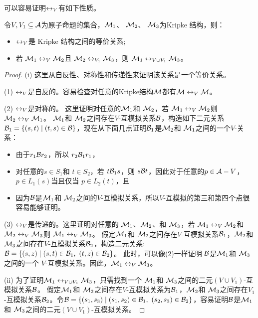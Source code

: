 可以容易证明$\leftrightarrow_V$有如下性质。

\begin{proposition} \label{pro:EqUnion}
	令$V, V_1 \subseteq {\cal A}$为原子命题的集合，${\cal M}_1$、 ${\cal M}_2$、 ${\cal M}_3$为Kripke 结构，则：
	\begin{itemize} 
		\item[(i)] $\leftrightarrow_V$是 Kripke 结构之间的等价关系;
		\item[(ii)] 若 ${\cal M}_1 \leftrightarrow_V {\cal M}_2$且 ${\cal M}_2 \leftrightarrow_{V_1} {\cal M}_3$，则 ${\cal M}_1 \leftrightarrow_{V \cup V_1} {\cal M}_3$。
	\end{itemize}
	
\end{proposition}
\begin{proof}
	(i) 这里从自反性、对称性和传递性来证明该关系是一个等价关系。
	
	(1) $\leftrightarrow_V$是自反的。容易检查对任意的Kripke结构${\cal M}$都有${\cal M}\leftrightarrow_V {\cal M}$。
	
	(2) $\leftrightarrow_V$是对称的。 这里证明对任意的${\cal M}_1$和 ${\cal M}_2$，若 ${\cal M}_1 \leftrightarrow_V {\cal M}_2$则 ${\cal M}_2 \leftrightarrow_V {\cal M}_1$。
	${\cal M}_1$和 ${\cal M}_2$之间存在$V$-互模拟关系${\cal B}$，构造如下二元关系${\cal B}_1=\{(s,t) \mid (t, s)\in {\cal B}\}$，现在从下面几点证明${\cal B}_1$是${\cal M}_2$和 ${\cal M}_1$之间的一个$V$-关系：
	\begin{itemize}
		\item 由于$r_1 {\cal B} r_2$，所以 $r_2 {\cal B}_1 r_1$，
		\item 对任意的$s\in S_1$和 $t\in S_2$，若 $t {\cal B}_1 s$，则 $s{\cal B} t$，因此对于任意的$p \in {\cal A} - V$，$p \in L_1(s)$当且仅当 $p \in L_2(t)$，且
		\item 因为${\cal B}$是${\cal M}_1$和 ${\cal M}_2$之间的$V$-互模拟关系，所以$V$-互模拟的第三和第四个点很容易能够证明。
	\end{itemize}
	
	(3) $\leftrightarrow_V$是传递的。这里证明对任意的 ${\cal M}_1$、${\cal M}_2$、和 ${\cal M}_3$，若 ${\cal M}_1 \leftrightarrow_V {\cal M}_2$和 ${\cal M}_2 \leftrightarrow_V {\cal M}_3$则 ${\cal M}_1 \leftrightarrow_V {\cal M}_3$。 假定${\cal M}_1$和 ${\cal M}_2$之间存在$V$-互模拟关系${\cal B}_1$，${\cal M}_2$和 ${\cal M}_3$之间存在$V$-互模拟关系${\cal B}_2$，构造二元关系: ${\cal B}=\{(s, z) \mid (s,t) \in {\cal B}_1,\ (t, z)\in {\cal B}_2\}$。
	此时，可以像(2)一样证明 ${\cal B}$是${\cal M}_1$和 ${\cal M}_3$之间的一个 $V$-互模拟关系。因此，${\cal M}_1 \leftrightarrow_V {\cal M}_3$。
	
	(ii) 为了证明${\cal M}_1 \leftrightarrow_{V\cup V_1} {\cal M}_3$，只需找到一个  ${\cal M}_1$和 ${\cal M}_3$之间的二元$(V\cup V_1)$-互模拟关系${\cal B}$。
	假定${\cal M}_1$和 ${\cal M}_2$之间存在$V$-互模拟关系为${\cal B}_1$，${\cal M}_2$和 ${\cal M}_3$之间存在$V_1$-互模拟关系${\cal B}_2$。令${\cal B} = \{(s_1, s_3)\mid (s_1, s_2) \in {\cal B}_1, \ (s_2, s_3) \in {\cal B}_2\}$，容易证明${\cal B}$是${\cal M}_1$和 ${\cal M}_3$之间的二元$(V\cup V_1)$-互模拟关系。
\end{proof}


